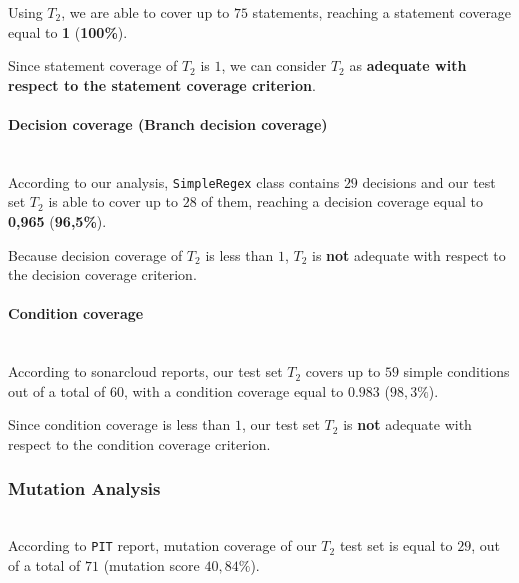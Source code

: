 \documentclass[sigconf]{acmart}
\begin{document}
Using $T_2$, we are able to cover up to $75$ statements, reaching a statement coverage equal to \textbf{1} (\textbf{100\%}).

Since statement coverage of $T_2$ is $1$, we can consider $T_2$ as \textbf{adequate with respect to the statement coverage criterion}.

\paragraph{Decision coverage (Branch decision coverage)}
\hfill\\

According to our analysis, \texttt{SimpleRegex} class contains $29$ decisions and our test set $T_2$ is able to cover up to $28$ of them, reaching a decision coverage equal to \textbf{0,965} (\textbf{96,5\%}). 

Because decision coverage of $T_2$ is less than $1$, $T_2$ is \textbf{not} adequate with respect to the decision coverage criterion.

\paragraph{Condition coverage}
\hfill\\

According to sonarcloud reports, our test set $T_2$ covers up to $59$ simple conditions out of a total of $60$, with a condition coverage equal to $0.983$ ($98,3\%$).

Since condition coverage is less than $1$, our test set $T_2$ is \textbf{not} adequate with respect to the condition coverage criterion. 

\subsubsection{Mutation Analysis}
\hfill\\

According to \texttt{PIT} report, mutation coverage of our $T_2$ test set is equal to $29$, out of a total of $71$ (mutation score $40,84 \%$). 





\end{document}
